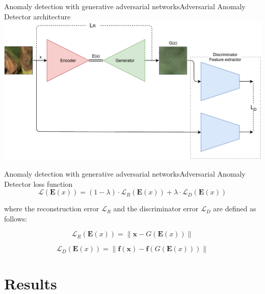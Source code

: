 \documentclass[15pt]{beamer} %
\begin{document}
\begin{frame}{Anomaly detection with generative adversarial networks}{\tiny{Adversarial Anomaly Detector architecture}}
  \includegraphics[width=\textwidth]{adversarial_anomaly_detector}
\end{frame}

\begin{frame}{Anomaly detection with generative adversarial networks}{\tiny{Adversarial Anomaly Detector loss function}}
 \begin{equation}
 \nonumber
 \mathcal{L}\left(\mathbf{E}(x)\right)=(1-\lambda) \cdot \mathcal{L}_{R}\left(\mathbf{E}(x)\right)+\lambda \cdot \mathcal{L}_{D}\left(\mathbf{E}(x)\right)
\end{equation} 

where the reconstruction error $\mathcal{L}_{R}$ and the discriminator error $\mathcal{L}_{D}$ are defined as follows:

\begin{equation}
 \nonumber
 \mathcal{L}_{R}\left(\mathbf{E}(x)\right)=\left\|\mathbf{x}-G\left(\mathbf{E}(x)\right)\right\|
\end{equation}

\begin{equation}
 \nonumber
 \mathcal{L}_{D}\left(\mathbf{E}(x)\right)=\left\|\mathbf{f}(\mathbf{x})-\mathbf{f}\left(G\left(\mathbf{E}(x)\right)\right)\right\|
\end{equation}

\end{frame}

\section{Results}
\end{document}
